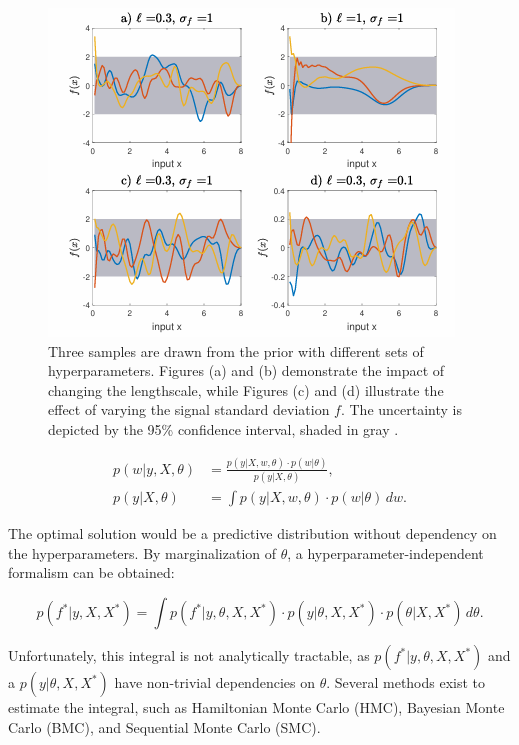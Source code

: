 \begin{figure}
    \centering
    \includegraphics[width=0.65\linewidth]{figures/opt_hyp_prior.png}
    \caption{Three samples are drawn from the prior with different sets of hyperparameters. Figures (a) and (b) demonstrate the impact of changing the lengthscale, while Figures (c) and (d) illustrate the effect of varying the signal standard deviation \( f \). The uncertainty is depicted by the 95\% confidence interval, shaded in gray \cite{rezvani2019gaussian}. }
    \label{fig:opt_hyp_prior}
\end{figure}






\begin{equation}\label{eq: marginal_likelihood}
\begin{aligned}
p(w|y,X,\theta) &= \frac{p(y|X,w,\theta) \cdot p(w|\theta)}{p(y|X,\theta)}, \\
p(y|X,\theta) &= \int p(y|X,w,\theta) \cdot p(w|\theta) \, dw.
\end{aligned}
\end{equation}




The optimal solution would be a predictive distribution without dependency on the hyperparameters. By marginalization of \( \theta \), a hyperparameter-independent formalism can be obtained:

\begin{equation}\label{eq: predictive_distribution}
p(f^*|y,X,X^*) = \int p(f^*|y,\theta,X,X^*) \cdot p(y|\theta,X,X^*) \cdot p(\theta|X,X^*) \, d\theta.
\end{equation}

Unfortunately, this integral is not analytically tractable, as \( p(f^*|y,\theta,X,X^*) \) and \qquad a \( p(y|\theta,X,X^*) \) have non-trivial dependencies on \( \theta \). Several methods exist to estimate the integral, such as Hamiltonian Monte Carlo (HMC), Bayesian Monte Carlo (BMC), and Sequential Monte Carlo (SMC).

